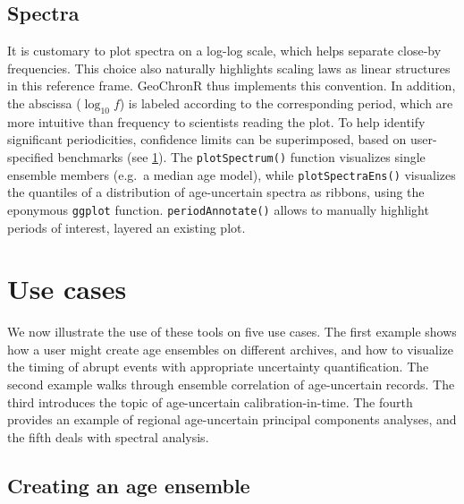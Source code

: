 \documentclass[gc, manuscript]{copernicus}
\begin{document}
\hypertarget{sec:spec_viz}{%
\subsection{Spectra}\label{sec:spec_viz}}

It is customary to plot spectra on a log-log scale, which helps separate close-by frequencies. This choice also naturally highlights scaling laws \citep[\citet{ZhuPNAS2019}]{lovejoy2013weather} as linear structures in this reference frame. GeoChronR thus implements this convention. In addition, the abscissa (\(\log_{10} f\)) is labeled according to the corresponding period, which are more intuitive than frequency to scientists reading the plot. To help identify significant periodicities, confidence limits can be superimposed, based on user-specified benchmarks (see \ref{sec:use-cases}). The \texttt{plotSpectrum()} function visualizes single ensemble members (e.g.~a median age model), while \texttt{plotSpectraEns()} visualizes the quantiles of a distribution of age-uncertain spectra as ribbons, using the eponymous \texttt{ggplot} function. \texttt{periodAnnotate()} allows to manually highlight periods of interest, layered an existing plot.

\hypertarget{sec:use-cases}{%
\section{Use cases}\label{sec:use-cases}}

We now illustrate the use of these tools on five use cases.
The first example shows how a user might create age ensembles on different archives, and how to visualize the timing of abrupt events with appropriate uncertainty quantification.
The second example walks through ensemble correlation of age-uncertain records.
The third introduces the topic of age-uncertain calibration-in-time.
The fourth provides an example of regional age-uncertain principal components analyses, and the fifth deals with spectral analysis.

\subsection{Creating an age ensemble}
\end{document}
